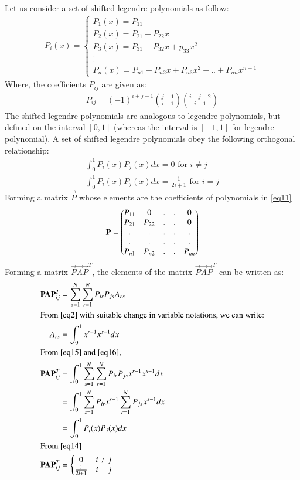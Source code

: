 \documentclass[journal,12pt,twocolumn]{IEEEtran}
\begin{document}
Let us consider a set of shifted legendre polynomials as follow:
\begin{align}
    P_i(x)=
    \left\{\begin{matrix}
P_1(x)=P_{11}\\ 
P_2(x)=P_{21}+P_{22}x\\
P_3(x)=P_{31}+P_{32}x+p_{33}x^2\\
.\\.\\
P_n(x)=P_{n1}+P_{n2}x+P_{n3}x^2+..+P_{nn}x^{n-1}
\end{matrix}\right. \label{eq11}
\end{align}
Where, the coefficients $P_{ij}$ are given as:
\begin{align}
P_{ij}=(-1)^{i+j-1} {j-1 \choose i-1} {i+j-2 \choose i-1} \label{eq12}
\end{align}
The shifted legendre polynomials are analogous to legendre polynomials, but defined on the interval $[0,1]$ (whereas the interval is $[-1,1]$ for legendre polynomial). \newpage
A set of shifted legendre polynomials obey the following orthogonal relationship:
\begin{align}
    \int_{0}^{1}P_i(x)P_j(x)dx=0\text{ for }i \neq j\\
    \int_{0}^{1}P_i(x)P_j(x)dx=\frac{1}{2i+1}\text{ for }i=j \label{eq14}
\end{align}
Forming a matrix $\vec{P}$ whose elements are the coefficients of polynomials in \eqref{eq11}
\begin{align}
    \vec{P}=\myvec{P_{11} & 0 &.&.&0\\
    P_{21} & P_{22} &.&.&0\\
    .&.&.&.&.\\.&.&.&.&.\\P_{n1} & P_{n2} &.&.&P_{nn}}
\end{align}
Forming a matrix $\vec{P}\vec{A}\vec{P}^T$, the elements of the matrix $\vec{P}\vec{A}\vec{P}^T$ can be written as:
\begin{align}
    \vec{P}\vec{A}\vec{P}^T_{ij}&=\sum_{s=1}^N\sum_{r=1}^NP_{ir}P_{js}A_{rs} \label{eq15}
    \\
    \intertext{From \eqref{eq2} with suitable change in variable notations, we can write:}
    A_{rs}&=\int_0^1x^{r-1}x^{s-1}dx \label{eq16}\\
    \intertext{From \eqref{eq15} and \eqref{eq16},}
    \vec{P}\vec{A}\vec{P}^T_{ij}&=\int_0^1\sum_{s=1}^N\sum_{r=1}^NP_{ir}P_{js}x^{r-1}x^{s-1}dx\\
    &=\int_0^1\sum_{s=1}^NP_{ir}x^{r-1}\sum_{r=1}^NP_{js}x^{s-1}dx \\
    &=\int_0^1P_i(x)P_j(x)dx\\
    \intertext{From \eqref{eq14}}
    \vec{P}\vec{A}\vec{P}^T_{ij}&=
    \left\{\begin{matrix}
    0 & i\neq j\\ 
    \frac{1}{2i+1} & i=j
    \end{matrix}\right.
\end{align}
\end{document}
